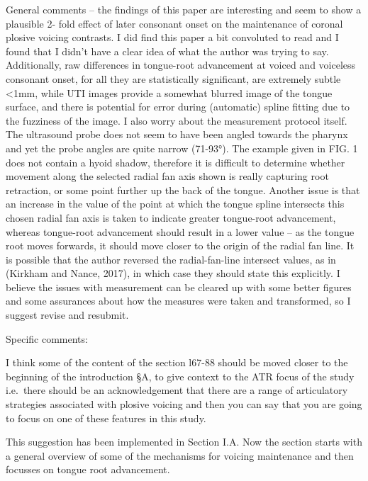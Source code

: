 \documentclass[]{article}
\begin{document}
General comments -- the findings of this paper are interesting and seem
to show a plausible 2- fold effect of later consonant onset on the
maintenance of coronal plosive voicing contrasts. I did find this paper
a bit convoluted to read and I found that I didn't have a clear idea of
what the author was trying to say. Additionally, raw differences in
tongue-root advancement at voiced and voiceless consonant onset, for all
they are statistically significant, are extremely subtle \textless{}1mm,
while UTI images provide a somewhat blurred image of the tongue surface,
and there is potential for error during (automatic) spline fitting due
to the fuzziness of the image. I also worry about the measurement
protocol itself. The ultrasound probe does not seem to have been angled
towards the pharynx and yet the probe angles are quite narrow (71-93°).
The example given in FIG. 1 does not contain a hyoid shadow, therefore
it is difficult to determine whether movement along the selected radial
fan axis shown is really capturing root retraction, or some point
further up the back of the tongue. Another issue is that an increase in
the value of the point at which the tongue spline intersects this chosen
radial fan axis is taken to indicate greater tongue-root advancement,
whereas tongue-root advancement should result in a lower value -- as the
tongue root moves forwards, it should move closer to the origin of the
radial fan line. It is possible that the author reversed the
radial-fan-line intersect values, as in (Kirkham and Nance, 2017), in
which case they should state this explicitly. I believe the issues with
measurement can be cleared up with some better figures and some
assurances about how the measures were taken and transformed, so I
suggest revise and resubmit.

Specific comments:

I think some of the content of the section l67-88 should be moved closer
to the beginning of the introduction §A, to give context to the ATR
focus of the study i.e.~there should be an acknowledgement that there
are a range of articulatory strategies associated with plosive voicing
and then you can say that you are going to focus on one of these
features in this study.

\color{plum}

This suggestion has been implemented in Section I.A. Now the section
starts with a general overview of some of the mechanisms for voicing
maintenance and then focusses on tongue root advancement. \color{black}
\end{document}
